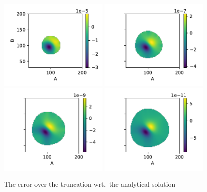 \begin{figure}
    \centering
    \includegraphics[width=0.48\textwidth]{gfx/par_bd_errs_0.1.pdf}
    \includegraphics[width=0.48\textwidth]{gfx/par_bd_errs_0.01.pdf}
    \includegraphics[width=0.48\textwidth]{gfx/par_bd_errs_0.001.pdf}
    \includegraphics[width=0.48\textwidth]{gfx/par_bd_errs_0.0001.pdf}
    \caption{The error over the truncation wrt.\ the analytical solution}
    \label{fig:par_bd_errors}
\end{figure}

